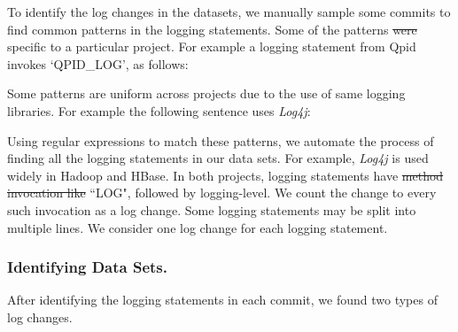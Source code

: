 \documentclass[conference]{IEEEtran}
\providecommand{\DIFadd}[1]{{\protect\color{blue}\uwave{#1}}} %
\providecommand{\DIFdel}[1]{{\protect\color{red}\sout{#1}}}                      %
\providecommand{\DIFaddbegin}{} %
\providecommand{\DIFaddend}{} %
\providecommand{\DIFdelbegin}{} %
\providecommand{\DIFdelend}{} %
\begin{document}
To identify the log changes in the datasets, we manually sample some commits to find common patterns in the logging statements.  Some of the patterns \DIFdelbegin \DIFdel{were }\DIFdelend \DIFaddbegin \DIFadd{are }\DIFaddend specific to a particular project. For example a logging statement from Qpid invokes `QPID\_LOG', as follows: 

\indent Some patterns are uniform across projects due to the use of same logging libraries. For example the following sentence uses \emph{Log4j}:



%
%
%
%
Using regular expressions to match these patterns, we automate the process of finding all the logging statements in our data sets. For example, \textsl{Log4j} is used widely in Hadoop and HBase. In both projects, logging statements have \DIFdelbegin \DIFdel{method invocation like }\DIFdelend \DIFaddbegin \DIFadd{a method invocation }\DIFaddend ``LOG", followed by logging-level. We count the change to every such invocation as a log change. Some logging statements  may be split into multiple lines. We consider one log change for each logging statement.


\subsubsection{Identifying Data Sets.}

After identifying the logging statements in each commit, we found two types of log changes. 
\end{document}
